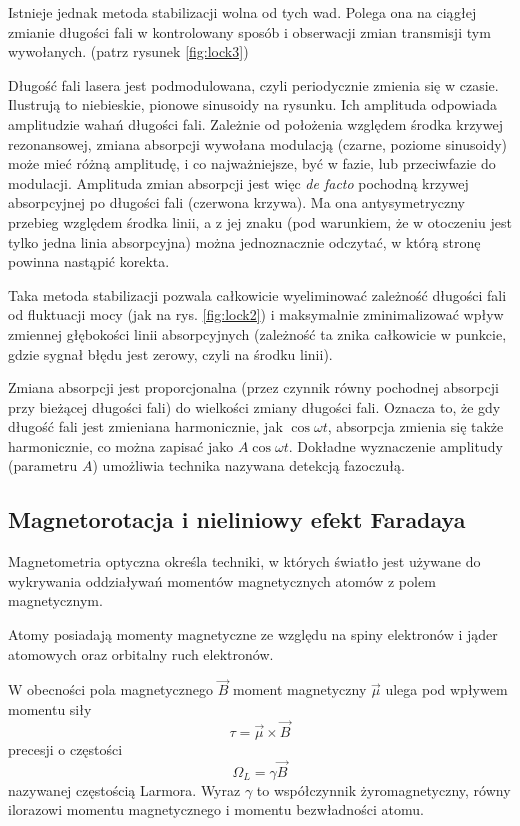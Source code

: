 \documentclass[a4paper,10pt]{article}
\begin{document}
Istnieje jednak metoda stabilizacji wolna od tych wad.
Polega ona na ciągłej zmianie długości fali w kontrolowany sposób i obserwacji zmian transmisji tym wywołanych. (patrz rysunek \ref{fig:lock3})

 Długość fali lasera jest podmodulowana, czyli periodycznie zmienia się w czasie. Ilustrują to niebieskie, pionowe sinusoidy na rysunku. Ich amplituda odpowiada amplitudzie wahań długości fali.
  Zależnie od położenia względem środka krzywej rezonansowej, zmiana absorpcji wywołana modulacją (czarne, poziome sinusoidy) może mieć
 różną amplitudę, i co najważniejsze, być w fazie, lub przeciwfazie do modulacji.
  Amplituda zmian absorpcji jest więc \textit{de facto} pochodną krzywej absorpcyjnej po długości fali (czerwona krzywa). 
  Ma ona antysymetryczny przebieg względem środka linii, a z jej znaku (pod warunkiem, że w otoczeniu jest tylko jedna linia absorpcyjna)
 można jednoznacznie odczytać, w którą stronę powinna nastąpić korekta.
 
 Taka metoda stabilizacji pozwala całkowicie wyeliminować zależność długości fali od fluktuacji mocy (jak na rys. \ref{fig:lock2})  i maksymalnie zminimalizować wpływ zmiennej głębokości linii absorpcyjnych (zależność ta znika całkowicie w punkcie, gdzie sygnał błędu jest zerowy, czyli na środku linii).

Zmiana absorpcji jest proporcjonalna (przez czynnik równy pochodnej absorpcji przy bieżącej długości fali) do wielkości zmiany długości fali. Oznacza to, że gdy długość fali jest zmieniana harmonicznie, jak $\cos \omega t$, absorpcja zmienia się także harmonicznie, co można zapisać jako $A \cos \omega t$. Dokładne wyznaczenie amplitudy (parametru $A$)
umożliwia technika nazywana detekcją fazoczułą.
\label{olockinie}


\pagebreak

\subsection{Magnetorotacja i nieliniowy efekt Faradaya}

Magnetometria optyczna określa techniki, w których światło jest używane  do wykrywania oddziaływań momentów magnetycznych atomów z polem magnetycznym.

Atomy posiadają momenty magnetyczne ze względu na spiny elektronów i jąder atomowych oraz orbitalny ruch elektronów.

W obecności pola magnetycznego $\vec B$ moment magnetyczny $\vec \mu$ ulega pod wpływem momentu siły
\begin{equation}
\tau =\vec \mu \times \vec B
\end{equation}
precesji o częstości
\begin{equation}
\Omega_L =\gamma \vec B
\end{equation}
nazywanej częstością Larmora. Wyraz $\gamma$ to współczynnik żyromagnetyczny, równy ilorazowi momentu magnetycznego i momentu bezwładności atomu.
\end{document}
